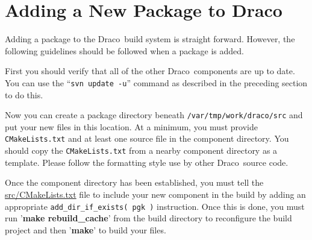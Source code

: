 \documentclass[11pt]{nmemo}
\newcommand{\comp}[1]{\normalfont\footnotesize\texttt{#1}\normalsize}
\newcommand{\draco}{{\normalfont\sffamily Draco}}
\newcommand{\emacs}{{\normalfont\bfseries Emacs}}
\begin{document}

\section{Adding a New Package to Draco}

Adding a package to the \draco\ build system is straight forward.
However, the following guidelines should be followed when a package is
added.

First you should verify that all of the other \draco\ components are
up to date.  You can use the ``\comp{svn update -u}'' command as
described in the preceding section to do this.

Now you can create a package directory beneath
\comp{/var/tmp/work/draco/src} and put your new files in this
location.  At a minimum, you must provide \comp{CMakeLists.txt} and at
least one source file in the component directory.  You should copy the
\comp{CMakeLists.txt} from a nearby component directory as a
template.  Please follow the formatting style use by other
\draco\ source code.


Once the component directory has been established, you must tell the
\url{src/CMakeLists.txt} file to include your new component in the
build by adding an appropriate \comp{add\_dir\_if\_exists( pgk )}
instruction.  Once this is done, you must run '\textbf{make
  rebuild\_cache}' from the build directory to reconfigure the build
project and then '\textbf{make}' to build your files.
\end{document}
